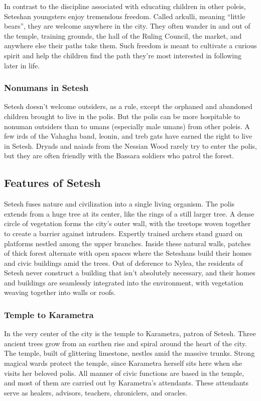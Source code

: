         In contrast to the discipline associated with educating children in other poleis, Seteshan youngsters enjoy tremendous freedom.
        Called arkulli, meaning ``little bears'', they are welcome anywhere in the city.
        They often wander in and out of the temple, training grounds, the hall of the Ruling Council, the market, and anywhere else their paths take them.
        Such freedom is meant to cultivate a curious spirit and help the children find the path they're most interested in following later in life.

    \subsubsection{Nonumans in Setesh}
        Setesh doesn't welcome outsiders, as a rule, except the orphaned and abandoned children brought to live in the polis.
        But the polis can be more hospitable to nonuman outsiders than to umans (especially male umans) from other poleis.
        A few irds of the Vahagha band, leonin, and treb gats have earned the right to live in Setesh.
        Dryads and naiads from the Nessian Wood rarely try to enter the polis, but they are often friendly with the Bassara soldiers who patrol the forest.

\subsection*{Features of Setesh}
    Setesh fuses nature and civilization into a single living organism.
    The polis extends from a huge tree at its center, like the rings of a still larger tree.
    A dense circle of vegetation forms the city's outer wall, with the treetops woven together to create a barrier against intruders.
    Expertly trained archers stand guard on platforms nestled among the upper branches.
    Inside these natural walls, patches of thick forest alternate with open spaces where the Seteshans build their homes and civic buildings amid the trees.
    Out of deference to Nylea, the residents of Setesh never construct a building that isn't absolutely necessary, and their homes and buildings are seamlessly integrated into the environment, with vegetation weaving together into walls or roofs.

    \subsubsection{Temple to Karametra}
        In the very center of the city is the temple to Karametra, patron of Setesh.
        Three ancient trees grow from an earthen rise and spiral around the heart of the city.
        The temple, built of glittering limestone, nestles amid the massive trunks.
        Strong magical wards protect the temple, since Karametra herself sits here when she visits her beloved polis.
        All manner of civic functions are based in the temple, and most of them are carried out by Karametra's attendants.
        These attendants serve as healers, advisors, teachers, chroniclers, and oracles.

